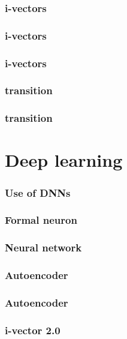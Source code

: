 \documentclass[11pt,english]{beamer}
\begin{document}
\begin{frame}
  \frametitle{i-vectors}
  
\end{frame}

\begin{frame}
  \frametitle{i-vectors}
  
\end{frame}

\begin{frame}
  \frametitle{i-vectors}
  
\end{frame}

\begin{frame}
  \frametitle{transition}
  
\end{frame}

\begin{frame}
  \frametitle{transition}
  
\end{frame}

\section{Deep learning}

\begin{frame}
  \frametitle{Use of DNNs}
  
\end{frame}

\begin{frame}
  \frametitle{Formal neuron}
  
\end{frame}

\begin{frame}
  \frametitle{Neural network}
  
\end{frame}

\begin{frame}
  \frametitle{Autoencoder}
  
\end{frame}

\begin{frame}
  \frametitle{Autoencoder}
  
\end{frame}

\begin{frame}
  \frametitle{i-vector 2.0}
  
\end{frame}
\end{document}
